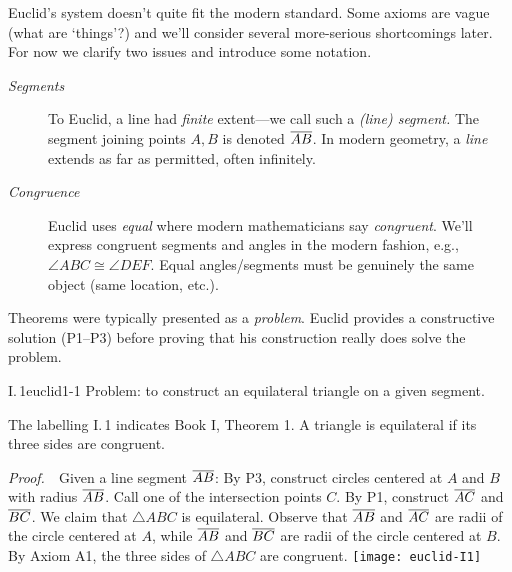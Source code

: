 Euclid's system doesn't quite fit the modern standard. Some axioms are vague (what are `things'?) and we'll consider several more-serious shortcomings later. For now we clarify two issues and introduce some notation.
\begin{description}
	\item[\normalfont\emph{Segments}] To Euclid, a line had \emph{finite} extent---we call such a \emph{(line) segment.} The segment joining points $A,B$ is denoted $\overline{AB}$. In modern geometry, a \emph{line} extends as far as permitted, often infinitely.
	\item[\normalfont\emph{Congruence}] Euclid uses \emph{equal} where modern mathematicians say \emph{congruent}. We'll express congruent segments and angles in the modern fashion, e.g., $\angle ABC\cong\angle DEF$. Equal angles/segments must be genuinely the same object (same location, etc.).
\end{description}



Theorems were typically presented as a \emph{problem}. Euclid provides a constructive solution (P1--P3) before proving that his construction really does solve the problem.

\begin{thm}{I.\,1}{euclid1-1}
	Problem: to construct an equilateral triangle on a given segment.
\end{thm}

The labelling I.\,1 indicates Book I, Theorem 1. A triangle is equilateral if its three sides are congruent.

\begin{tcolorbox}[proofstyle, lower separated=false, sidebyside, sidebyside align=top seam, sidebyside gap=0pt, righthand width=0.35\linewidth]
	\emph{Proof.}\ \ Given a line segment $\overline{AB}$:\smallbreak
	By P3, construct circles centered at $A$ and $B$ with radius $\overline{AB}$.\smallbreak
	Call one of the intersection points $C$. By P1, construct $\overline{AC}$ and $\overline{BC}$.\smallbreak
	We claim that $\triangle ABC$ is equilateral.\medbreak
	Observe that $\overline{AB}$ and $\overline{AC}$ are radii of the circle centered at $A$, while $\overline{AB}$ and $\overline{BC}$ are radii of the circle centered at $B$. By Axiom A1, the three sides of $\triangle ABC$ are congruent.
	\tcblower
	\flushright\texttt{[image: euclid-I1]}\hfil\qedsymbol
\end{tcolorbox}


